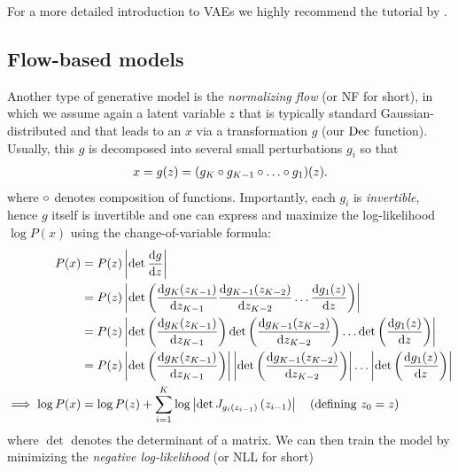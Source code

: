\documentclass[../main.tex]{subfiles}
\begin{document}
For a more detailed introduction to VAEs we highly recommend the tutorial by \citeauthor{doerschTutorial2021} \cite{doerschTutorial2021}.

\subsection{Flow-based models}
\label{bg/nf}

Another type of generative model is the \emph{normalizing flow} (or NF for short), in which we assume again a latent variable $z$ that is typically standard Gaussian-distributed and that leads to an $x$ via a transformation $g$ (our $\operatorname{Dec}$ function).
Usually, this $g$ is decomposed into several small perturbations $g_i$ so that
\begin{align*}
x = g(z) = (g_K \circ g_{K-1} \circ \ldots \circ g_1) (z).
\end{align*}
where $\circ$ denotes composition of functions.
Importantly, each $g_i$ is \emph{invertible}, hence $g$ itself is invertible and one can express and maximize the log-likelihood $\log P(x)$ using the change-of-variable formula:
%
\begin{align*}
    P(x)               & = P(z) \left\lvert \det \frac{\mathrm{d} g}{\mathrm{d} z} \right\rvert       \\
                       & = P(z) \left\lvert \det \left(
        \frac{\mathrm{d} g_K(z_{K-1})}{\mathrm{d} z_{K-1}}
        \frac{\mathrm{d} g_{K-1}(z_{K-2})}{\mathrm{d} z_{K-2}}
        \ldots
        \frac{\mathrm{d} g_1(z)}{\mathrm{d} z}
    \right)\right\rvert                                                   \\
                       & = P(z) \left\lvert
        \det \left(
        \frac{\mathrm{d} g_K(z_{K-1})}{\mathrm{d} z_{K-1}}
        \right)
        \det \left(
        \frac{\mathrm{d} g_{K-1}(z_{K-2})}{\mathrm{d} z_{K-2}}
        \right)
        \ldots
        \det \left(
        \frac{\mathrm{d} g_1(z)}{\mathrm{d} z}
        \right)
    \right\rvert                                                          \\
                       & = P(z) \left\lvert
        \det \left(
        \frac{\mathrm{d} g_K(z_{K-1})}{\mathrm{d} z_{K-1}}
        \right)
    \right\rvert
    \left\lvert
        \det \left(
        \frac{\mathrm{d} g_{K-1}(z_{K-2})}{\mathrm{d} z_{K-2}}
        \right)
    \right\rvert
    \ldots
    \left\lvert
        \det \left(
        \frac{\mathrm{d} g_1(z)}{\mathrm{d} z}
        \right)
    \right\rvert                                                          \\
    \implies \log P(x) & = \log P(z) + \sum_{i=1}^K \log \left\lvert
        \det J_{g_i(z_{i-1})} \left( z_{i-1} \right)
    \right\rvert\quad \text{(defining $z_0 = z$)}
\end{align*}
where $\det$ denotes the determinant of a matrix.
We can then train the model by minimizing the \emph{negative log-likelihood} (or NLL for short)
\end{document}
